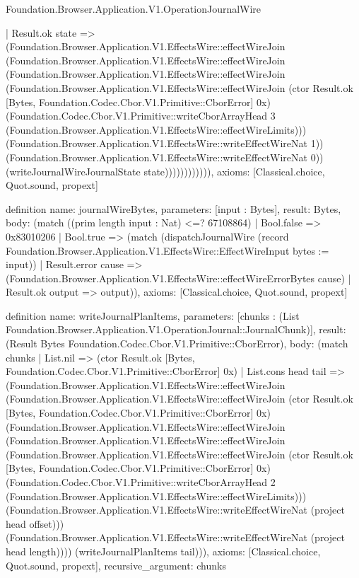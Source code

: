 \begin{lexlean}{Foundation.Browser.Application.V1.OperationJournalWire}
\begin{semanticmodule}
{                      | Result.ok state => (Foundation.Browser.Application.V1.EffectsWire::effectWireJoin (Foundation.Browser.Application.V1.EffectsWire::effectWireJoin (Foundation.Browser.Application.V1.EffectsWire::effectWireJoin (Foundation.Browser.Application.V1.EffectsWire::effectWireJoin (ctor Result.ok [Bytes, Foundation.Codec.Cbor.V1.Primitive::CborError] 0x) (Foundation.Codec.Cbor.V1.Primitive::writeCborArrayHead 3 (Foundation.Browser.Application.V1.EffectsWire::effectWireLimits))) (Foundation.Browser.Application.V1.EffectsWire::writeEffectWireNat 1)) (Foundation.Browser.Application.V1.EffectsWire::writeEffectWireNat 0)) (writeJournalWireJournalState state)))))))))))),
  axioms: [Classical.choice, Quot.sound, propext]
}

definition{
  name: journalWireBytes,
  parameters: [input : Bytes],
  result: Bytes,
  body: (match ((prim length input : Nat) <=? 67108864)
    | Bool.false => 0x83010206
    | Bool.true => (match (dispatchJournalWire (record Foundation.Browser.Application.V1.EffectsWire::EffectWireInput {bytes := input}))
      | Result.error cause => (Foundation.Browser.Application.V1.EffectsWire::effectWireErrorBytes cause)
      | Result.ok output => output)),
  axioms: [Classical.choice, Quot.sound, propext]
}

definition{
  name: writeJournalPlanItems,
  parameters: [chunks : (List Foundation.Browser.Application.V1.OperationJournal::JournalChunk)],
  result: (Result Bytes Foundation.Codec.Cbor.V1.Primitive::CborError),
  body: (match chunks
    | List.nil => (ctor Result.ok [Bytes, Foundation.Codec.Cbor.V1.Primitive::CborError] 0x)
    | List.cons head tail => (Foundation.Browser.Application.V1.EffectsWire::effectWireJoin (Foundation.Browser.Application.V1.EffectsWire::effectWireJoin (ctor Result.ok [Bytes, Foundation.Codec.Cbor.V1.Primitive::CborError] 0x) (Foundation.Browser.Application.V1.EffectsWire::effectWireJoin (Foundation.Browser.Application.V1.EffectsWire::effectWireJoin (Foundation.Browser.Application.V1.EffectsWire::effectWireJoin (ctor Result.ok [Bytes, Foundation.Codec.Cbor.V1.Primitive::CborError] 0x) (Foundation.Codec.Cbor.V1.Primitive::writeCborArrayHead 2 (Foundation.Browser.Application.V1.EffectsWire::effectWireLimits))) (Foundation.Browser.Application.V1.EffectsWire::writeEffectWireNat (project head offset))) (Foundation.Browser.Application.V1.EffectsWire::writeEffectWireNat (project head length)))) (writeJournalPlanItems tail))),
  axioms: [Classical.choice, Quot.sound, propext],
  recursive_argument: chunks
}


\end{semanticmodule}
\end{lexlean}
